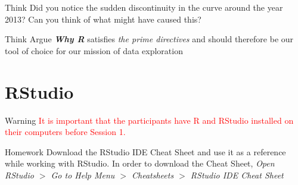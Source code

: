 \documentclass[12pt]{book}\usepackage{knitr}
\begin{document}
\begin{DIY}{Think}
Did you notice the sudden discontinuity in the curve around the year 2013? Can you think of what might have caused this?
\end{DIY}

\begin{DIY}{Think}
Argue \textbf{\emph{Why R}} satisfies \emph{the prime directives} and should therefore be our tool of choice for our mission of data exploration
\end{DIY}
    
\section{RStudio}

\begin{HIGHLIGHT}
\par{}
\end{HIGHLIGHT}

\begin{DIY}{Warning}
\textcolor{red}{It is important that the participants have R and RStudio installed on their computers before Session 1.}
\end{DIY}

\begin{DIY}{Homework}
Download the RStudio IDE Cheat Sheet and use it as a reference while working with RStudio. In order to download the Cheat Sheet, \emph{Open RStudio $>$ Go to  Help Menu $>$ Cheatsheets $>$ RStudio IDE Cheat Sheet}
\end{DIY}

\newpage

\end{document}
